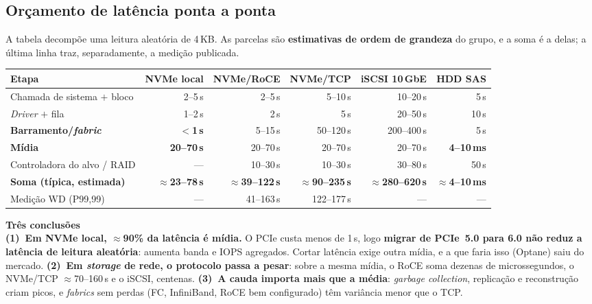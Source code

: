 \documentclass[11pt,a4paper]{article}
\newcommand{\destaque}[2]{%
  \begin{center}\begin{minipage}{0.97\textwidth}
  \colorbox{fundo}{\begin{minipage}{\dimexpr\linewidth-2\fboxsep}
  \vspace{3pt}\textbf{\color{azul}#1}\\[2pt]\small #2\vspace{3pt}
  \end{minipage}}\end{minipage}\end{center}}
\newcommand{\us}{\,\textmu s}
\begin{document}
\subsection{Orçamento de latência ponta a ponta}

A tabela decompõe uma leitura aleatória de 4\,KB. As parcelas são \textbf{estimativas de
ordem de grandeza} do grupo, e a soma é a delas; a última linha traz, separadamente, a medição
publicada.

\begin{center}\small
\setlength{\tabcolsep}{4pt}
\begin{tabular}{@{}>{\RaggedRight\arraybackslash}p{3.3cm}rrrrr@{}}
\toprule
\textbf{Etapa} & \textbf{NVMe local} & \textbf{NVMe/RoCE} & \textbf{NVMe/TCP} & \textbf{iSCSI 10\,GbE} & \textbf{HDD SAS} \\
\midrule
Chamada de sistema $+$ bloco & 2--5\us & 2--5\us & 5--10\us & 10--20\us & 5\us \\
\emph{Driver} $+$ fila & 1--2\us & 2\us & 5\us & 20--50\us & 10\us \\
\textbf{Barramento/\emph{fabric}} & \textbf{$<$1\us} & 5--15\us & 50--120\us & 200--400\us & 5\us \\
\textbf{Mídia} & \textbf{20--70\us} & 20--70\us & 20--70\us & 20--70\us & \textbf{4--10\,ms} \\
Controladora do alvo / RAID & --- & 10--30\us & 10--30\us & 30--80\us & 50\us \\
\midrule
\textbf{Soma (típica, estimada)} & \textbf{$\approx$23--78\us} & \textbf{$\approx$39--122\us} & \textbf{$\approx$90--235\us} & \textbf{$\approx$280--620\us} & \textbf{$\approx$4--10\,ms} \\
Medição WD (P99,99) & --- & 41--163\us & 122--177\us & --- & --- \\
\bottomrule
\end{tabular}
\end{center}

\destaque{Três conclusões}{%
\textbf{(1)~Em NVMe local, $\approx$90\% da latência é mídia.} O PCIe custa menos de 1\us{},
logo \textbf{migrar de PCIe~5.0 para 6.0 não reduz a latência de leitura aleatória}: aumenta
banda e IOPS agregados. Cortar latência exige outra mídia, e a que faria isso (Optane) saiu do
mercado. \textbf{(2)~Em \emph{storage} de rede, o protocolo passa a pesar}: sobre a mesma
mídia, o RoCE soma dezenas de microssegundos, o NVMe/TCP $\approx$70--160\us{} e o iSCSI,
centenas. \textbf{(3)~A cauda importa mais que a média}: \emph{garbage collection},
replicação e reconstrução criam picos, e \emph{fabrics} sem perdas (FC, InfiniBand, RoCE bem
configurado) têm variância menor que o TCP.}
\end{document}
